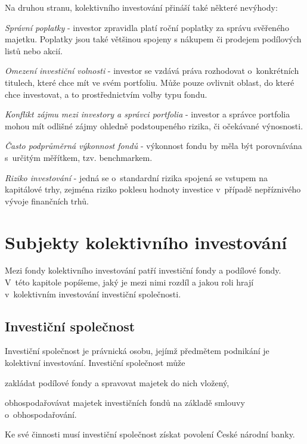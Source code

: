 \documentclass[a4paper,12pt]{article}
\begin{document}
\medskip

\noindent
Na druhou stranu,  kolektivního investování přináší také některé nevýhody:
\begin{compactitem}
\item \emph{Správní poplatky} - investor zpravidla platí roční poplatky za správu svěřeného majetku. Poplatky jsou také většinou spojeny s nákupem či prodejem podílových listů nebo akcií.
\item \emph{Omezení investiční volnosti} - investor se vzdává práva rozhodovat o~konkrétních titulech, které chce mít ve svém portfoliu. Může pouze ovlivnit oblast, do které chce investovat, a to prostřednictvím volby typu fondu. 
\item \emph{Konflikt zájmu mezi investory a správci portfolia} - investor a správce portfolia mohou mít odlišné zájmy ohledně podstoupeného rizika, či očekávané výnosnosti.
\item \emph{Často podprůměrná výkonnost fondů} - výkonnost fondu by měla být porovnávána s~určitým měřítkem, tzv. benchmarkem.
\item \emph{Riziko investování} - jedná se o~standardní rizika spojená se vstupem na kapitálové trhy, zejména riziko poklesu hodnoty investice v~případě nepříznivého vývoje finančních trhů.
\end{compactitem}

\section{Subjekty kolektivního investování}
Mezi fondy kolektivního investování patří investiční fondy a podílové fondy. V~této kapitole popíšeme, jaký je mezi nimi rozdíl a jakou roli hrají v~kolektivním investování investiční společnosti.
 
\subsection{Investiční společnost}
Investiční společnost je právnická osobu, jejímž předmětem podnikání je kolektivní investování. Investiční společnost může
\begin{compactitem}
\item zakládat podílové fondy a spravovat majetek do nich vložený,
\item obhospodařovávat majetek investičních fondů na základě smlouvy o~obhospodařování.
\end{compactitem}
Ke své činnosti musí investiční společnost získat povolení České národní banky.
\end{document}
